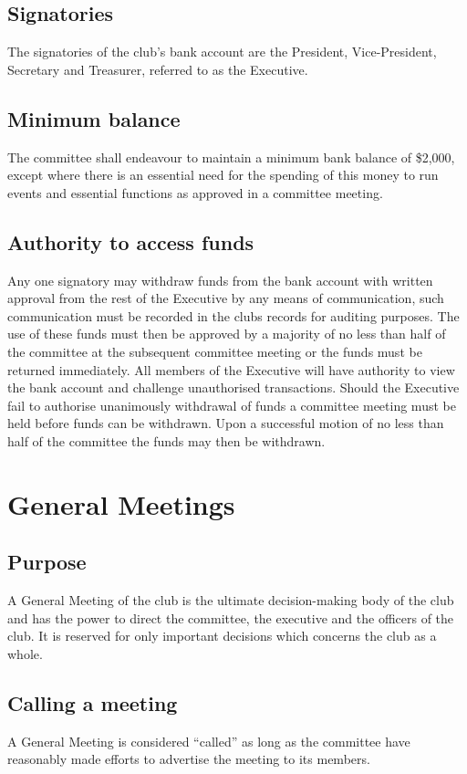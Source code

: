 \documentclass[11pt]{article}
\begin{document}
\subsection{Signatories}
The signatories of the club’s bank account are the President, Vice-President, Secretary and Treasurer, referred to as the Executive.
\subsection{Minimum balance}
The committee shall endeavour to maintain a minimum bank balance of \$2,000, except where there is an essential need for the spending of this money to run events and essential functions as approved in a committee meeting.
\subsection{Authority to access funds}
Any one signatory may withdraw funds from the bank account with written approval from the rest of the Executive by any means of communication, such communication must be recorded in the clubs records for auditing purposes. The use of these funds must then be approved by a majority of no less than half of the committee at the subsequent committee meeting or the funds must be returned immediately. All members of the Executive will have authority to view the bank account and challenge unauthorised transactions.
Should the Executive fail to authorise unanimously withdrawal of funds a committee meeting must be held before funds can be withdrawn. Upon a successful motion of no less than half of the committee the funds may then be withdrawn.

\section{General Meetings}\label{generalMeetings}
\subsection{Purpose}
A General Meeting of the club is the ultimate decision-making body of the club and has the power to direct the committee, the executive and the officers of the club. It is reserved for only important decisions which concerns the club as a whole.
\subsection{Calling a meeting}
A General Meeting is considered “called” as long as the committee have reasonably made efforts to advertise the meeting to its members.
\end{document}
